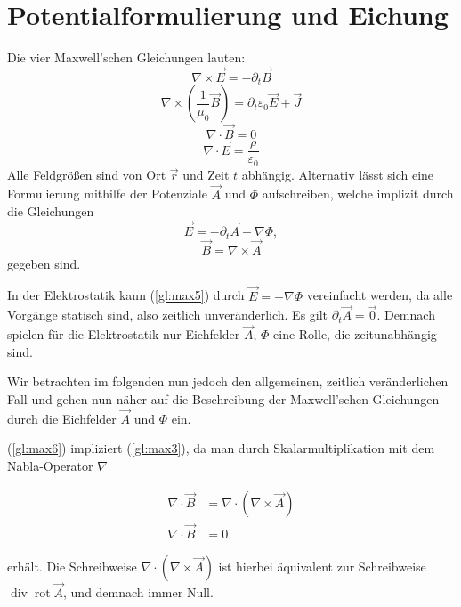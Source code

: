 \section{Potentialformulierung und Eichung}
Die vier Maxwell'schen Gleichungen lauten:
\begin{equation}
\label{gl:max1}
\nabla \times \vec{E} = -\partial_t\vec{B}
\end{equation}
\begin{equation}
\label{gl:max2}
\nabla \times \left(\frac{1}{\mu_0}\vec{B}\right) = \partial_t\varepsilon_0\vec{E} + \vec{J}
\end{equation}
\begin{equation}
\label{gl:max3}
\nabla \cdot \vec{B} = 0
\end{equation}
\begin{equation}
\label{gl:max4}
\nabla \cdot \vec{E} = \frac{\rho}{\varepsilon_0}
\end{equation}
Alle Feldgrößen sind von Ort $\vec{r}$ und Zeit $t$ abhängig. Alternativ lässt sich eine Formulierung mithilfe der Potenziale $\vec{A}$ und $\Phi$ aufschreiben, welche implizit durch die Gleichungen
\begin{equation}
\label{gl:max5}
\vec{E} = -\partial_t\vec{A} - \nabla\Phi,
\end{equation}
\begin{equation}
\label{gl:max6}
\vec{B} = \nabla\times\vec{A}
\end{equation}
gegeben sind.

In der Elektrostatik kann (\ref{gl:max5}) durch $\vec{E} = - \nabla\Phi$ vereinfacht werden, da alle Vorgänge statisch sind, also zeitlich unveränderlich. Es gilt $\partial_t\vec{A} = \vec{0}$. Demnach spielen für die Elektrostatik nur Eichfelder $\vec{A}$, $\Phi$ eine Rolle, die zeitunabhängig sind.

Wir betrachten im folgenden nun jedoch den allgemeinen, zeitlich veränderlichen Fall und gehen nun näher auf die Beschreibung der Maxwell'schen Gleichungen durch die Eichfelder $\vec{A}$ und $\Phi$ ein.

(\ref{gl:max6}) impliziert (\ref{gl:max3}), da man durch Skalarmultiplikation mit dem Nabla-Operator $\nabla$

\begin{align*}
\nabla \cdot \vec{B} &= \nabla \cdot (\nabla\times\vec{A}) \\
\nabla \cdot \vec{B} &= 0
\end{align*}

erhält. Die Schreibweise $\nabla \cdot (\nabla\times\vec{A})$ ist hierbei äquivalent zur Schreibweise $\operatorname{div} \operatorname{rot} \vec{A}$, und demnach immer Null.

